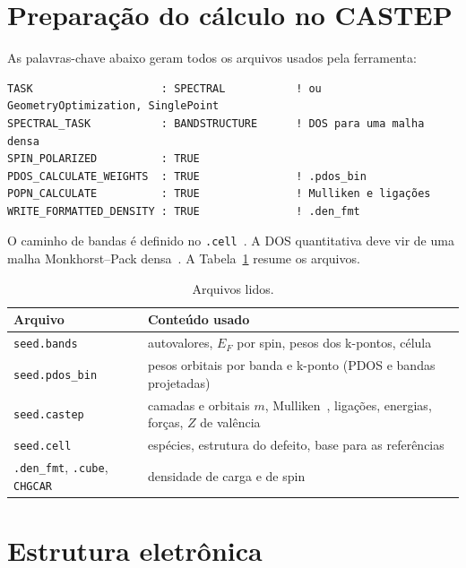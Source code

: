 \documentclass[11pt,a4paper]{article}
\begin{document}
\section{Preparação do cálculo no CASTEP}
As palavras-chave abaixo geram todos os arquivos usados pela ferramenta:
\begin{lstlisting}
TASK                    : SPECTRAL           ! ou GeometryOptimization, SinglePoint
SPECTRAL_TASK           : BANDSTRUCTURE      ! DOS para uma malha densa
SPIN_POLARIZED          : TRUE
PDOS_CALCULATE_WEIGHTS  : TRUE               ! .pdos_bin
POPN_CALCULATE          : TRUE               ! Mulliken e ligações
WRITE_FORMATTED_DENSITY : TRUE               ! .den_fmt
\end{lstlisting}
O caminho de bandas é definido no \texttt{.cell}~\cite{setyawan2010}. A DOS quantitativa deve vir de uma malha Monkhorst--Pack densa~\cite{monkhorst1976}. A Tabela~\ref{tab:arquivos} resume os arquivos.
\begin{table}[h]\centering\small
\caption{Arquivos lidos.}\label{tab:arquivos}
\begin{tabularx}{\linewidth}{lX}\toprule
Arquivo & Conteúdo usado\\\midrule
\texttt{seed.bands} & autovalores, $E_F$ por spin, pesos dos k-pontos, célula\\
\texttt{seed.pdos\_bin} & pesos orbitais por banda e k-ponto (PDOS e bandas projetadas)\\
\texttt{seed.castep} & camadas e orbitais $m$, Mulliken~\cite{mulliken1955,segall1996}, ligações, energias, forças, $Z$ de valência\\
\texttt{seed.cell} & espécies, estrutura do defeito, base para as referências\\
\texttt{.den\_fmt}, \texttt{.cube}, \texttt{CHGCAR} & densidade de carga e de spin\\\bottomrule
\end{tabularx}
\end{table}

\section{Estrutura eletrônica}
\end{document}
